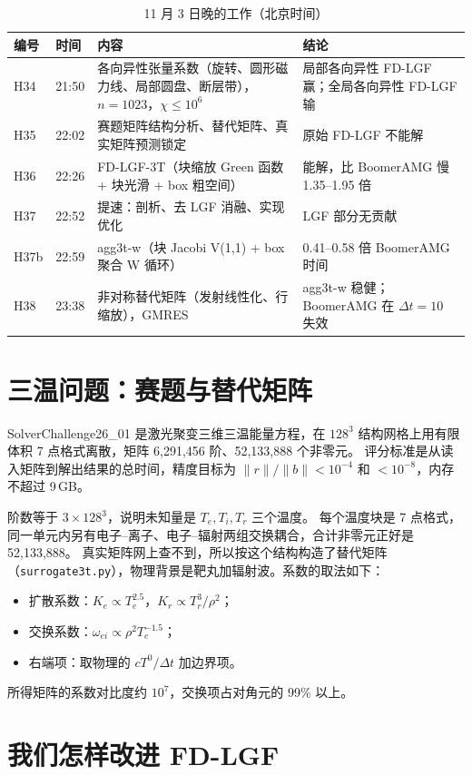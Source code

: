 \documentclass[11pt,a4paper]{ctexart}
\begin{document}
\begin{table}[H]\centering\small
\caption{11 月 3 日晚的工作（北京时间）}
\begin{tabular}{p{1.1cm}p{1.3cm}p{6.6cm}p{5.0cm}}
\toprule
编号 & 时间 & 内容 & 结论 \\
\midrule
H34 & 21:50 & 各向异性张量系数（旋转、圆形磁力线、局部圆盘、断层带），$n=1023$，$\chi\le10^6$ & 局部各向异性 FD-LGF 赢；全局各向异性 FD-LGF 输 \\
H35 & 22:02 & 赛题矩阵结构分析、替代矩阵、真实矩阵预测锁定 & 原始 FD-LGF 不能解 \\
H36 & 22:26 & FD-LGF-3T（块缩放 Green 函数 + 块光滑 + box 粗空间） & 能解，比 BoomerAMG 慢 1.35--1.95 倍 \\
H37 & 22:52 & 提速：剖析、去 LGF 消融、实现优化 & LGF 部分无贡献 \\
H37b & 22:59 & agg3t-w（块 Jacobi V(1,1) + box 聚合 W 循环） & 0.41--0.58 倍 BoomerAMG 时间 \\
H38 & 23:38 & 非对称替代矩阵（发射线性化、行缩放），GMRES & agg3t-w 稳健；BoomerAMG 在 $\Delta t=10$ 失效 \\
\bottomrule
\end{tabular}
\end{table}

\section{三温问题：赛题与替代矩阵}
SolverChallenge26\_01 是激光聚变三维三温能量方程，在 $128^3$ 结构网格上用有限体积 7 点格式离散，矩阵 6,291,456 阶、52,133,888 个非零元。
评分标准是从读入矩阵到解出结果的总时间，精度目标为 $\|r\|/\|b\|<10^{-4}$ 和 $<10^{-8}$，内存不超过 9\,GB。

阶数等于 $3\times128^3$，说明未知量是 $T_e,T_i,T_r$ 三个温度。
每个温度块是 7 点格式，同一单元内另有电子--离子、电子--辐射两组交换耦合，合计非零元正好是 52,133,888。
真实矩阵网上查不到，所以按这个结构构造了替代矩阵（\texttt{surrogate3t.py}），物理背景是靶丸加辐射波。系数的取法如下：
\begin{itemize}
\item 扩散系数：$K_e\propto T_e^{2.5}$，$K_r\propto T_r^3/\rho^2$；
\item 交换系数：$\omega_{ei}\propto\rho^2T_e^{-1.5}$；
\item 右端项：取物理的 $cT^0/\Delta t$ 加边界项。
\end{itemize}
所得矩阵的系数对比度约 $10^7$，交换项占对角元的 99\% 以上。

\section{我们怎样改进 FD-LGF}
\end{document}
